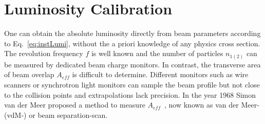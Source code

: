\section {Luminosity Calibration} \label{sec:lumiCalibration}
One can obtain the absolute luminosity directly from beam parameters according to Eq.~\ref{eq:instLumi},
without the a priori knowledge of any physics cross section.
The revolution frequency $f$ is well known and the number of particles
$n_{1(2)}$ can be measured by dedicated beam charge monitors.
In contrast, the transverse area of beam overlap $A_{eff}$ is difficult to determine.
Different monitors such as wire scanners or synchrotron light monitors can sample the beam
profile but not close to the collision points and extrapolations lack precision.
In the year 1968 Simon van der Meer proposed a method to measure $A_{eff}$~\cite{vanderMeer:296752}, now  known as van der Meer- (vdM-) or beam separation-scan.

